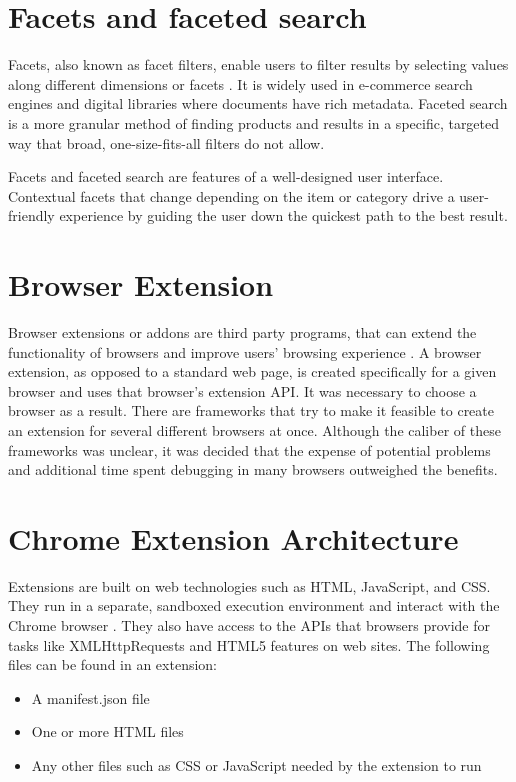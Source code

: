 \section{Facets and faceted search}
Facets, also known as facet filters, enable users to filter results by selecting values along different dimensions or facets \autocite{qu2021study}. It is widely used in e-commerce search engines and digital libraries where documents have rich metadata. Faceted search is a more granular method of finding products and results in a specific, targeted way that broad, one-size-fits-all filters do not allow.

Facets and faceted search are features of a well-designed user interface. Contextual facets that change depending on the item or category drive a user-friendly experience by guiding the user down the quickest path to the best result.


\section{Browser Extension}
Browser extensions or addons are third party programs, that can extend the functionality of browsers and improve users' browsing experience \autocite{some2019empoweb}. A browser extension, as opposed to a standard web page, is created specifically for a given browser and uses that browser's extension API. It was necessary to choose a browser as a result. There are frameworks that try to make it feasible to create an extension for several different browsers at once. Although the caliber of these frameworks was unclear, it was decided that the expense of potential problems and additional time spent debugging in many browsers outweighed the benefits.


\section{Chrome Extension Architecture}
Extensions are built on web technologies such as HTML, JavaScript, and CSS. They run in a separate, sandboxed execution environment and interact with the Chrome browser \autocite{google2021what}. They also have access to the APIs that browsers provide for tasks like XMLHttpRequests and HTML5 features on web sites. The following files can be found in an extension:

\begin{itemize}
  \item A manifest.json file
  \item One or more HTML files
  \item Any other files such as CSS or JavaScript needed by the extension to run
\end{itemize}

